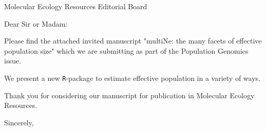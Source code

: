 \documentclass{letter}
\begin{document}
\begin{letter}{Molecular Ecology Resources Editorial Board}
\opening{Dear Sir or Madam:}
Please find the attached invited manuscript "multiNe: the many facets of effective population size" which we are submitting as part of the Population Genomics issue. 

We present a new \texttt{R}-package to estimate effective population in a variety of ways. 

Thank you for considering our manuscript for publication in Molecular Ecology Resources. 
\closing{Sincerely,}
\end{letter}
\end{document}
